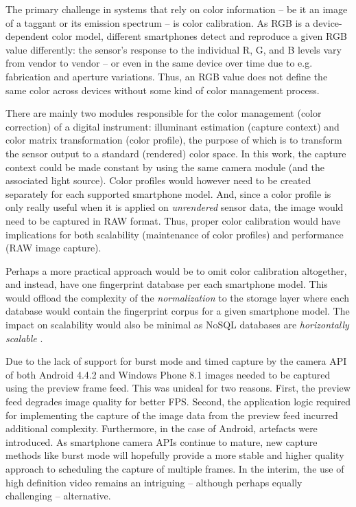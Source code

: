 \documentclass[thesis.tex]{subfiles}
\begin{document}
The primary challenge in systems that rely on color information -- be it an image of a taggant or its emission spectrum -- is color calibration. As RGB is a device-dependent color model, different smartphones detect and reproduce a given RGB value differently: the sensor's response to the individual R, G, and B levels vary from vendor to vendor -- or even in the same device over time due to e.g. fabrication and aperture variations. Thus, an RGB value does not define the same color across devices without some kind of color management process.

There are mainly two modules responsible for the color management (color correction) of a digital instrument: illuminant estimation (capture context) and color matrix transformation (color profile), the purpose of which is to transform the sensor output to a standard (rendered) color space. In this work, the capture context could be made constant by using the same camera module (and the associated light source). Color profiles would however need to be created separately for each supported smartphone model. And, since a color profile is only really useful when it is applied on \emph{unrendered} sensor data, the image would need to be captured in RAW format. Thus, proper color calibration would have implications for both scalability (maintenance of color profiles) and performance (RAW image capture). \cite{multiple_cameras} \cite{color_correction_pipeline}

Perhaps a more practical approach would be to omit color calibration altogether, and instead, have one fingerprint database per each smartphone model. This would offload the complexity of the \emph{normalization} to the storage layer where each database would contain the fingerprint corpus for a given smartphone model. The impact on scalability would also be minimal as NoSQL databases are \emph{horizontally scalable} \cite{nosql_scalability}.

Due to the lack of support for burst mode and timed capture by the camera API of both Android 4.4.2 and Windows Phone 8.1 images needed to be captured using the preview frame feed. This was unideal for two reasons. First, the preview feed degrades image quality for better FPS. Second, the application logic required for implementing the capture of the image data from the preview feed incurred additional complexity. Furthermore, in the case of Android, artefacts were introduced. As smartphone camera APIs continue to mature, new capture methods like burst mode will hopefully provide a more stable and higher quality approach to scheduling the capture of multiple frames. In the interim, the use of high definition video remains an intriguing -- although perhaps equally challenging -- alternative.
\end{document}
